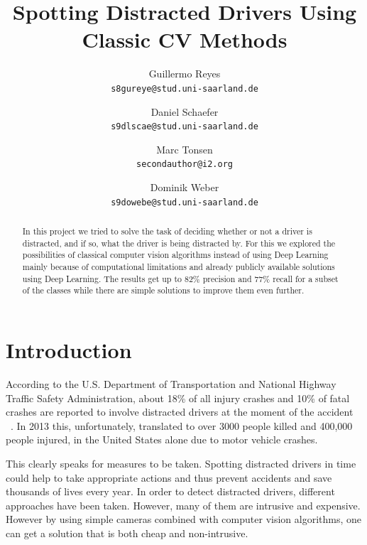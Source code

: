 \documentclass[10pt,twocolumn,letterpaper]{article}
\begin{document}
\title{Spotting Distracted Drivers Using Classic CV Methods}

\author{Guillermo Reyes\\
{\tt\small s8gureye@stud.uni-saarland.de}
\and
Daniel Schaefer\\
{\tt\small s9dlscae@stud.uni-saarland.de}
\and
Marc Tonsen\\
{\tt\small secondauthor@i2.org}
\and
Dominik Weber\\
{\tt\small s9dowebe@stud.uni-saarland.de}
}

\maketitle

\begin{abstract}
   In this project we tried to solve the task of deciding whether or not a driver is distracted, and if so, what the driver is being distracted by. For this we explored the possibilities of classical computer vision algorithms instead of using Deep Learning mainly because of computational limitations and already publicly available solutions using Deep Learning. The results get up to 82\% precision and 77\% recall for a subset of the classes while there are simple solutions to improve them even further.
\end{abstract}


\section{Introduction}


According to the U.S. Department of Transportation and National Highway Traffic Safety Administration, about 18\% of all injury crashes and 10\% of fatal crashes are reported to involve distracted drivers at the moment of the accident ~\cite{knuthwebsite}. In 2013 this, unfortunately, translated to over 3000 people killed and 400,000 people injured, in the United States alone due to motor vehicle crashes.

This clearly speaks for measures to be taken. Spotting distracted drivers in time could help to take appropriate actions and thus prevent accidents and save thousands of lives every year. In order to detect distracted drivers, different approaches have been taken. However, many of them are intrusive and expensive. However by using simple cameras combined with computer vision algorithms, one can get a solution that is both cheap and non-intrusive.\\
\end{document}

